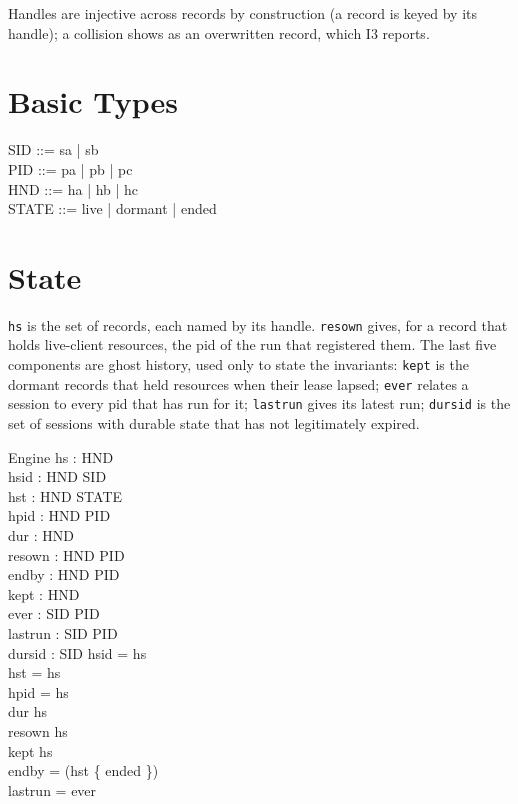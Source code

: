 \documentclass[a4paper,10pt,fleqn]{article}
\begin{document}
Handles are injective across records by construction (a record is keyed by its
handle); a collision shows as an overwritten record, which I3 reports.

\section{Basic Types}

\begin{zed}
  SID ::= sa | sb \\
  PID ::= pa | pb | pc \\
  HND ::= ha | hb | hc \\
  STATE ::= live | dormant | ended
\end{zed}

\section{State}

\texttt{hs} is the set of records, each named by its handle.  \texttt{resown}
gives, for a record that holds live-client resources, the pid of the run that
registered them.  The last five components are ghost history, used only to
state the invariants: \texttt{kept} is the dormant records that held resources
when their lease lapsed; \texttt{ever} relates a session to every pid that has
run for it; \texttt{lastrun} gives its latest run; \texttt{dursid} is the set
of sessions with durable state that has not legitimately expired.

\begin{schema}{Engine}
  hs : \power HND \\
  hsid : HND \pfun SID \\
  hst : HND \pfun STATE \\
  hpid : HND \pfun PID \\
  dur : \power HND \\
  resown : HND \pfun PID \\
  endby : HND \pfun PID \\
  kept : \power HND \\
  ever : SID \rel PID \\
  lastrun : SID \pfun PID \\
  dursid : \power SID
\where
  \dom hsid = hs \\
  \dom hst = hs \\
  \dom hpid = hs \\
  dur \subseteq hs \\
  \dom resown \subseteq hs \\
  kept \subseteq hs \\
  \dom endby = \dom (hst \rres \{ ended \}) \\
  \dom lastrun = \dom ever
\end{schema}
\end{document}
